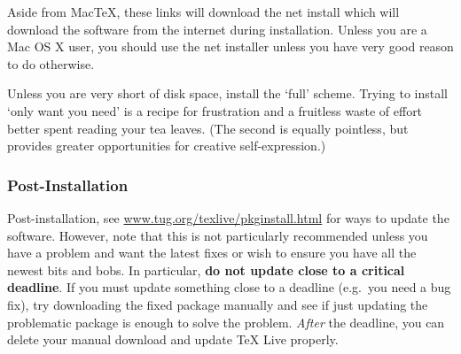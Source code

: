 \noindent Aside from Mac\TeX{}, these links will download the net install which will download the software from the internet during installation.
Unless you are a Mac OS X user, you should use the net installer unless you have very good reason to do otherwise. 

Unless you are very short of disk space, install the ‘full’ scheme.
Trying to install ‘only want you need’ is a recipe for frustration and a fruitless waste of effort better spent reading your tea leaves. 
(The second is equally pointless, but provides greater opportunities for creative self-expression.)

\subsubsection<1-| beamer:0>{Post-Installation}

Post-installation, see \url{www.tug.org/texlive/pkginstall.html} for ways to update the software.
However, note that this is not particularly recommended unless you have a problem and want the latest fixes or wish to ensure you have all the newest bits and bobs.
In particular, \textbf{do not update close to a critical deadline}.
If you must update something close to a deadline (e.g.~you need a bug fix), try downloading the fixed package manually and see if just updating the problematic package is enough to solve the problem.
\emph{After} the deadline, you can delete your manual download and update \TeX{} Live properly.




